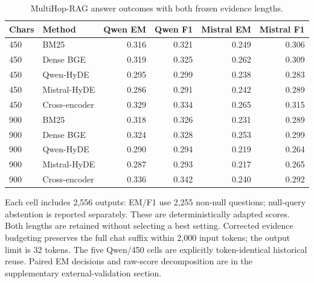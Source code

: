 \begin{table}[!htbp]
\centering\footnotesize
\caption{MultiHop-RAG answer outcomes with both frozen evidence lengths.}
\label{tab:mhrag_answers}
\begin{threeparttable}
\setlength{\tabcolsep}{3pt}
\begin{tabular}{llrrrr}
\toprule
Chars & Method & Qwen EM & Qwen F1 & Mistral EM & Mistral F1 \\
\midrule
450 & BM25 & 0.316 & 0.321 & 0.249 & 0.306 \\
450 & Dense BGE & 0.319 & 0.325 & 0.262 & 0.309 \\
450 & Qwen-HyDE & 0.295 & 0.299 & 0.238 & 0.283 \\
450 & Mistral-HyDE & 0.286 & 0.291 & 0.242 & 0.289 \\
450 & Cross-encoder & 0.329 & 0.334 & 0.265 & 0.315 \\
900 & BM25 & 0.318 & 0.326 & 0.231 & 0.289 \\
900 & Dense BGE & 0.324 & 0.328 & 0.253 & 0.299 \\
900 & Qwen-HyDE & 0.290 & 0.294 & 0.219 & 0.264 \\
900 & Mistral-HyDE & 0.287 & 0.293 & 0.217 & 0.265 \\
900 & Cross-encoder & 0.336 & 0.342 & 0.240 & 0.292 \\
\bottomrule
\end{tabular}
\begin{tablenotes}\scriptsize\item Each cell includes 2,556 outputs: EM/F1 use 2,255 non-null questions; null-query abstention is reported separately. These are deterministically adapted scores. Both lengths are retained without selecting a best setting. Corrected evidence budgeting preserves the full chat suffix within 2,000 input tokens; the output limit is 32 tokens. The five Qwen/450 cells are explicitly token-identical historical reuse. Paired EM decisions and raw-score decomposition are in the supplementary external-validation section.
\end{tablenotes}
\end{threeparttable}
\end{table}

